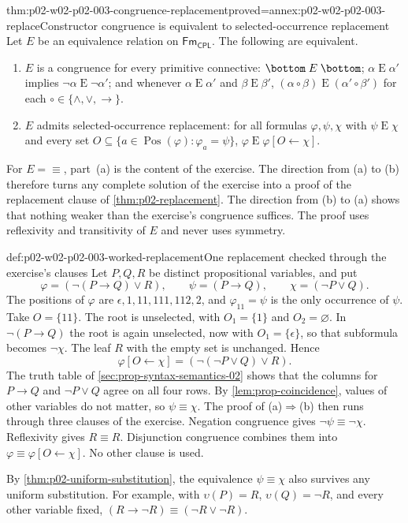 \begin{hbtheorem}{thm:p02-w02-p02-003-congruence-replacement}{proved=annex:p02-w02-p02-003-replace}{Constructor congruence is equivalent to selected-occurrence replacement}
Let \(E\) be an equivalence relation on \(\mathsf{Fm}_{\mathsf{CPL}}\).  The
following are equivalent.
\begin{enumerate}
  \item[(a)] \(E\) is a congruence for every primitive connective:
        \(\bottom\mathrel{E}\bottom\); \(\alpha\mathrel{E}\alpha'\) implies
        \(\neg\alpha\mathrel{E}\neg\alpha'\); and whenever
        \(\alpha\mathrel{E}\alpha'\) and \(\beta\mathrel{E}\beta'\),
        \((\alpha\circ\beta)\mathrel{E}(\alpha'\circ\beta')\) for each
        \(\circ\in\{\land,\lor,\to\}\).
  \item[(b)] \(E\) admits selected-occurrence replacement: for all formulas
        \(\varphi,\psi,\chi\) with \(\psi\mathrel{E}\chi\) and every set
        \(O\subseteq\{a\in\operatorname{Pos}(\varphi):\varphi_a=\psi\}\),
        \(\varphi\mathrel{E}\varphi[O\leftarrow\chi]\).
\end{enumerate}
\end{hbtheorem}

For \(E={\equiv}\), part~(a) is the content of the exercise.  The direction
from (a) to (b) therefore turns any complete solution of the exercise into a
proof of the replacement clause of \cref{thm:p02-replacement}.  The direction
from (b) to (a) shows that nothing weaker than the exercise's congruence
suffices.  The proof uses reflexivity and transitivity of \(E\) and never
uses symmetry.

\begin{hbexample}{def:p02-w02-p02-003-worked-replacement}{One replacement checked through the exercise's clauses}
Let \(P,Q,R\) be distinct propositional variables, and put
\[
 \varphi=(\neg(P\to Q)\lor R),\qquad
 \psi=(P\to Q),\qquad
 \chi=(\neg P\lor Q).
\]
The positions of \(\varphi\) are \(\epsilon,1,11,111,112,2\), and
\(\varphi_{11}=\psi\) is the only occurrence of \(\psi\).  Take
\(O=\{11\}\).  The root is unselected, with \(O_1=\{1\}\) and
\(O_2=\varnothing\).  In \(\neg(P\to Q)\) the root is again unselected, now
with \(O_1=\{\epsilon\}\), so that subformula becomes \(\neg\chi\).  The
leaf \(R\) with the empty set is unchanged.  Hence
\[
 \varphi[O\leftarrow\chi]=(\neg(\neg P\lor Q)\lor R).
\]
The truth table of \cref{sec:prop-syntax-semantics-02} shows that the
columns for \(P\to Q\) and \(\neg P\lor Q\) agree on all four rows.  By
\cref{lem:prop-coincidence}, values of other variables do not matter, so
\(\psi\equiv\chi\).  The proof of (a)\(\Rightarrow\)(b) then runs through
three clauses of the exercise.  Negation congruence gives
\(\neg\psi\equiv\neg\chi\).  Reflexivity gives \(R\equiv R\).  Disjunction
congruence combines them into
\(\varphi\equiv\varphi[O\leftarrow\chi]\).  No other clause is used.

By \cref{thm:p02-uniform-substitution}, the equivalence
\(\psi\equiv\chi\) also survives any uniform substitution.  For example, with
\(\upsilon(P)=R\), \(\upsilon(Q)=\neg R\), and every other variable fixed,
\((R\to\neg R)\equiv(\neg R\lor\neg R)\).
\end{hbexample}

